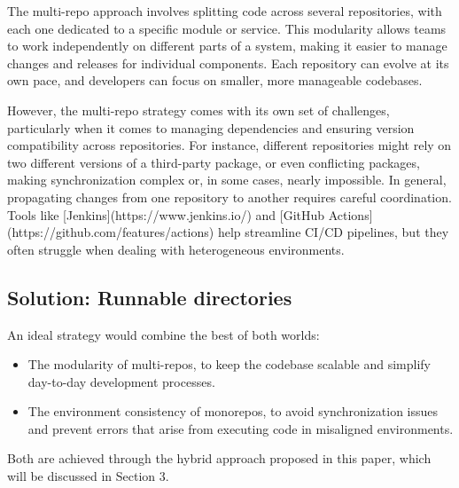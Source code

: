 The multi-repo approach involves splitting code across several
repositories, with each one dedicated to a specific module or service.
This modularity allows teams to work independently on different parts
of a system, making it easier to manage changes and releases for individual
components. Each repository can evolve at its own pace, and developers
can focus on smaller, more manageable codebases.

However, the multi-repo strategy comes with its own set of challenges,
particularly when it comes to managing dependencies and ensuring
version compatibility across repositories. For instance, different
repositories might rely on two different versions of a third-party
package, or even conflicting packages, making synchronization complex
or, in some cases, nearly impossible. In general, propagating changes
from one repository to another requires careful coordination. Tools like
[Jenkins](https://www.jenkins.io/) and [GitHub Actions](https://github.com/features/actions)
help streamline CI/CD pipelines, but they often struggle when dealing with
heterogeneous environments.

\subsection{Solution: Runnable directories}

An ideal strategy would combine the best of both worlds:

\begin{itemize}
  \item The modularity of multi-repos, to keep the codebase scalable
    and simplify day-to-day development processes.

  \item The environment consistency of monorepos, to avoid
    synchronization issues and prevent errors that arise from
    executing code in misaligned environments.
\end{itemize}

Both are achieved through the hybrid approach proposed in this paper,
which will be discussed in Section 3.

